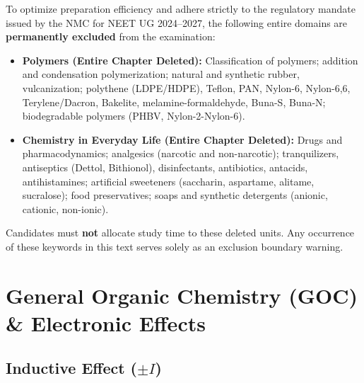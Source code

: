 \documentclass[10pt,a4paper]{article}
\begin{document}
\begin{trapbox}
To optimize preparation efficiency and adhere strictly to the regulatory mandate issued by the NMC for NEET UG 2024--2027, the following entire domains are \textbf{permanently excluded} from the examination:
\begin{itemize}
  \item \textbf{Polymers (Entire Chapter Deleted):} Classification of polymers; addition and condensation polymerization; natural and synthetic rubber, vulcanization; polythene (LDPE/HDPE), Teflon, PAN, Nylon-6, Nylon-6,6, Terylene/Dacron, Bakelite, melamine-formaldehyde, Buna-S, Buna-N; biodegradable polymers (PHBV, Nylon-2-Nylon-6).
  \item \textbf{Chemistry in Everyday Life (Entire Chapter Deleted):} Drugs and pharmacodynamics; analgesics (narcotic and non-narcotic); tranquilizers, antiseptics (Dettol, Bithionol), disinfectants, antibiotics, antacids, antihistamines; artificial sweeteners (saccharin, aspartame, alitame, sucralose); food preservatives; soaps and synthetic detergents (anionic, cationic, non-ionic).
\end{itemize}
Candidates must \textbf{not} allocate study time to these deleted units. Any occurrence of these keywords in this text serves solely as an exclusion boundary warning.
\end{trapbox}

\section{General Organic Chemistry (GOC) \& Electronic Effects}

\subsection{Inductive Effect (\texorpdfstring{$\pm I$}{+-I})}
\end{document}

